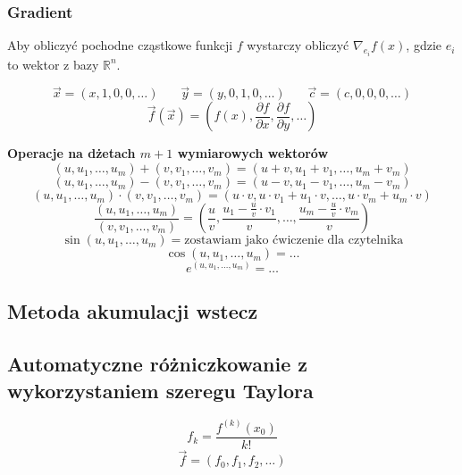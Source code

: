 \documentclass[../mn-notatki.tex]{subfiles}
\begin{document}
\subsubsection{Gradient}
Aby obliczyć pochodne cząstkowe funkcji $f$ wystarczy obliczyć
$\nabla_{e_i}f(x)$,
gdzie $e_i$ to wektor z bazy $\mathbb{R}^n$.

\begin{tcolorbox}
\[
\vec{x} = (x, 1, 0, 0, \ldots) ~~~~~~~~ \vec{y} = (y, 0, 1, 0, \ldots) ~~~~~~~~ \vec{c} = (c, 0, 0, 0, \ldots)
\]
\[
\vec{f}(\vec{x}) = \left(f(x), \frac{\partial f}{\partial x}, \frac{\partial f}{\partial y}, \ldots \right)
\]
\end{tcolorbox}

\begin{tcolorbox}
\textbf{Operacje na dżetach $m+1$ wymiarowych wektorów}
    $$(u,u_1,\ldots, u_m) + (v,v_1,\ldots, v_m) = (u + v, u_1 + v_1, \ldots, u_m + v_m)$$
    $$(u,u_1,\ldots, u_m) - (v,v_1,\ldots, v_m) = (u - v, u_1 - v_1, \ldots, u_m - v_m)$$
    $$(u,u_1,\ldots, u_m) \cdot (v,v_1,\ldots, v_m) = (u \cdot v, u \cdot v_1 + u_1 \cdot v, \ldots, u \cdot v_m + u_m \cdot v)$$
    $$\frac{(u,u_1,\ldots, u_m)}{(v,v_1,\ldots, v_m)} = \left(\frac{u}{v}, \frac{u_1 - \frac{u}{v}\cdot v_1}{v}, \ldots, \frac{u_m - \frac{u}{v}\cdot v_m}{v}\right)$$
    $$\sin(u,u_1,\ldots, u_m) = \text{zostawiam jako ćwiczenie dla czytelnika}$$
    $$\cos(u,u_1,\ldots, u_m) = \ldots$$
    $$e^{(u,u_1,\ldots, u_m)} = \ldots$$
\end{tcolorbox}

\subsection{Metoda akumulacji wstecz}
\pagebreak

\subsection{Automatyczne różniczkowanie z wykorzystaniem szeregu Taylora}
\begin{tcolorbox}
\[
f_k = \frac{f^{(k)}(x_0)}{k!}
\]
\[
\vec{f} = (f_0, f_1, f_2, \ldots)
\]
\end{tcolorbox}
\end{document}
